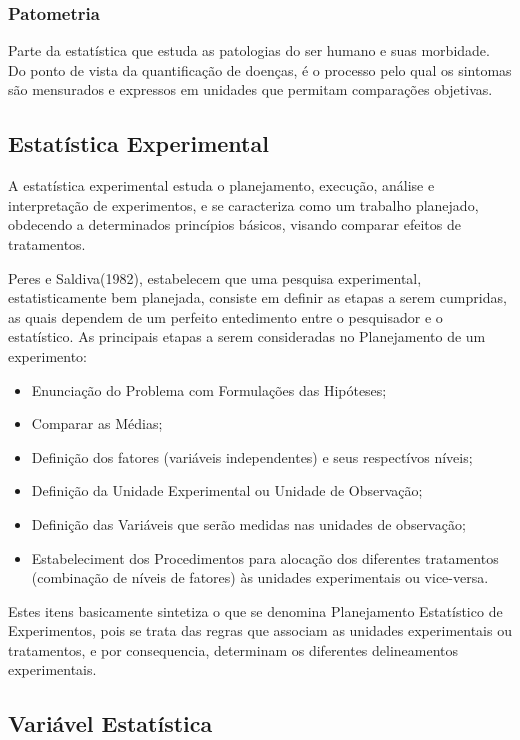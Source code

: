 \subsubsection{Patometria}

Parte da estatística que estuda as patologias do ser humano e suas morbidade. Do ponto de vista da quantificação de doenças, é o processo pelo qual os sintomas são mensurados e expressos em unidades que permitam comparações objetivas.



\subsection{Estatística Experimental}

A estatística experimental estuda o planejamento, execução, análise e interpretação de experimentos, e se caracteriza como um trabalho planejado, obdecendo a determinados princípios básicos, visando comparar efeitos de tratamentos.\vskip0.3cm

Peres e Saldiva(1982), estabelecem que uma pesquisa experimental, estatisticamente bem planejada, consiste em definir as etapas a serem cumpridas, as quais dependem de um perfeito entedimento entre o pesquisador e o estatístico. As principais etapas a serem consideradas no Planejamento de um experimento:

\begin{itemize}
    \item Enunciação do Problema com Formulações das Hipóteses;
    \item Comparar as Médias;
    \item Definição dos fatores (variáveis independentes) e seus respectívos níveis;
    \item Definição da Unidade Experimental ou Unidade de Observação;
    \item Definição das Variáveis que serão medidas nas unidades de observação;
    \item Estabeleciment dos Procedimentos para alocação dos diferentes tratamentos (combinação de níveis de fatores) às unidades experimentais ou vice-versa.
\end{itemize}

Estes itens basicamente sintetiza o que se denomina Planejamento Estatístico de Experimentos, pois se trata das regras que associam as unidades experimentais ou tratamentos, e por consequencia, determinam os diferentes delineamentos experimentais.   


\newpage
\subsection{Variável Estatística}

